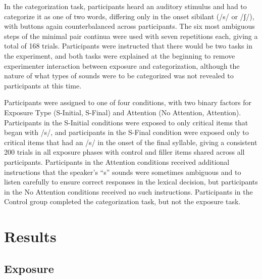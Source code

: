 \documentclass[a4paper,11pt,twocolumn]{article}
\begin{document}
In the categorization task, participants heard an auditory stimulus and had to categorize it as one of two words, differing only in the onset sibilant (/s/ or /ʃ/), with buttons again counterbalanced across participants.  The six most ambiguous steps of the minimal pair continua were used with seven repetitions each, giving a total of 168 trials. Participants were instructed that there would be two tasks in the experiment, and both tasks were explained at the beginning to remove experimenter interaction between exposure and categorization, although the nature of what types of sounds were to be categorized was not revealed to participants at this time.  

Participants were assigned to one of four conditions, with two binary factors for Exposure Type (S-Initial, S-Final) and Attention (No Attention, Attention).  Participants in the S-Initial conditions were exposed to only critical items that began with /s/, and participants in the S-Final condition were exposed only to critical items that had an /s/ in the onset of the final syllable, giving a consistent 200 trials in all exposure phases with control and filler items shared across all participants.  Participants in the Attention conditions received additional instructions that the speaker's ``s'' sounds were sometimes ambiguous and to listen carefully to ensure correct responses in the lexical decision, but participants in the No Attention conditions received no such instructions.  Participants in the Control group completed the categorization task, but not the exposure task.

\section{Results}

\subsection{Exposure}
\end{document}
